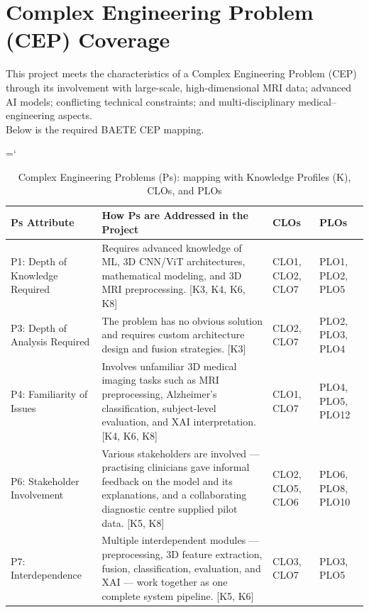 \section{Complex Engineering Problem (CEP) Coverage}
This project meets the characteristics of a Complex Engineering Problem (CEP) through its involvement with large-scale, high-dimensional MRI data; advanced AI models; conflicting technical constraints; and multi-disciplinary medical–engineering aspects.\\
Below is the required BAETE CEP mapping.
\begin{sloppypar}
\hyphenchar\font=`\-
\begin{longtable}{|p{3.2cm}|p{6.6cm}|p{2.1cm}|p{2.1cm}|}
\caption{Complex Engineering Problems (Ps): mapping with Knowledge Profiles (K), CLOs, and PLOs}\\
\hline
\textbf{Ps Attribute} & \textbf{How Ps are Addressed in the Project} & \textbf{CLOs} & \textbf{PLOs}\\
\hline
P1: Depth of Knowledge Required & Requires advanced knowledge of ML, 3D CNN/ViT architectures, mathematical modeling, and 3D MRI preprocessing. [K3, K4, K6, K8] & CLO1, CLO2, CLO7 & PLO1, PLO2, PLO5\\
\hline
P3: Depth of Analysis Required & The problem has no obvious solution and requires custom architecture design and fusion strategies. [K3] & CLO2, CLO7 & PLO2, PLO3, PLO4\\
\hline
P4: Familiarity of Issues & Involves unfamiliar 3D medical imaging tasks such as MRI preprocessing, Alzheimer's classification, subject-level evaluation, and XAI interpretation. [K4, K6, K8] & CLO1, CLO7 & PLO4, PLO5, PLO12\\
\hline
P6: Stakeholder Involvement & Various stakeholders are involved --- practising clinicians gave informal feedback on the model and its explanations, and a collaborating diagnostic centre supplied pilot data. [K5, K8] & CLO2, CLO5, CLO6 & PLO6, PLO8, PLO10\\
\hline
P7: Interdependence & Multiple interdependent modules --- preprocessing, 3D feature extraction, fusion, classification, evaluation, and XAI --- work together as one complete system pipeline. [K5, K6] & CLO3, CLO7 & PLO3, PLO5\\
\hline
\end{longtable}
\end{sloppypar}


